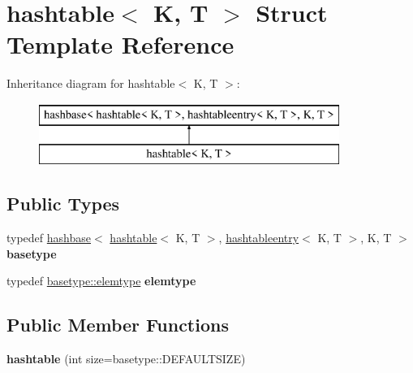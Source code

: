\hypertarget{structhashtable}{}\section{hashtable$<$ K, T $>$ Struct Template Reference}
\label{structhashtable}
Inheritance diagram for hashtable$<$ K, T $>$\+:\begin{figure}[H]
\begin{center}
\leavevmode
\includegraphics[height=2.000000cm]{structhashtable}
\end{center}
\end{figure}
\subsection*{Public Types}
\begin{DoxyCompactItemize}
\item 
\mbox{\label{structhashtable_a6293bf03faedf41b5da3e61c55f165ce}} 
typedef \hyperlink{structhashbase}{hashbase}$<$ \hyperlink{structhashtable}{hashtable}$<$ K, T $>$, \hyperlink{structhashtableentry}{hashtableentry}$<$ K, T $>$, K, T $>$ {\bfseries basetype}
\item 
\mbox{\label{structhashtable_aa17f663dc44e924ffb3d497d82cb5db9}} 
typedef \hyperlink{structhashtableentry}{basetype\+::elemtype} {\bfseries elemtype}
\end{DoxyCompactItemize}
\subsection*{Public Member Functions}
\begin{DoxyCompactItemize}
\item 
\mbox{\label{structhashtable_adb434ea3da2c1513ea38afb50fcf9e64}} 
{\bfseries hashtable} (int size=basetype\+::\+D\+E\+F\+A\+U\+L\+T\+S\+I\+ZE)
\end{DoxyCompactItemize}
